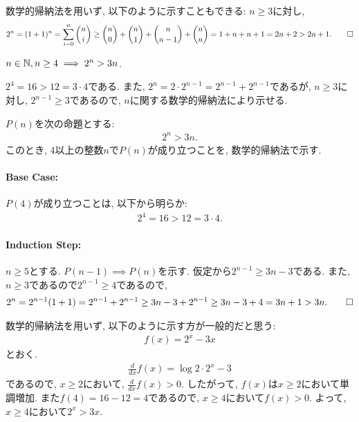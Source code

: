 \begin{rem}
  数学的帰納法を用いず, 以下のように示すこともできる:
  $n\geq 3$に対し, 
  \begin{align*}
    2^n=(1+1)^n=\sum_{i=0}^n \binom{n}{i}\geq \binom{n}{0}+\binom{n}{1}+\binom{n}{n-1}+\binom{n}{n}=1+n+n+1=2n+2> 2n+1
    .\qedhere
  \end{align*}
\end{rem}

\begin{prop}
  \label{p:20230814}
  $n\in\mathbb{N}, n\geq 4\implies 2^n > 3n$.
\end{prop}
\begin{proof**}
  $2^4=16>12=3\cdot 4$である.
  また,
  $2^n=2\cdot 2^{n-1}=2^{n-1}+2^{n-1}$であるが,
  $n\geq 3$に対し,
  $2^{n-1} \geq 3$であるので,
  $n$に関する数学的帰納法により示せる.
\end{proof**}
\begin{proof*}
  $P(n)$を次の命題とする:
  \begin{align*}
    2^n > 3n
    .
  \end{align*}
  このとき,
  $4$以上の整数$n$で$P(n)$が成り立つことを,
  数学的帰納法で示す.

  \paragraph{Base Case:}
  $P(4)$が成り立つことは, 以下から明らか:
  \begin{align*}
    2^4=16>12=3\cdot 4.
  \end{align*}
  \paragraph{Induction Step:}
  $n\geq 5$とする.
  $P(n-1)\implies P(n)$を示す.
  仮定から$2^{n-1}\geq 3n-3$である.
  また, $n\geq 3$であるので$2^{n-1}\geq 4$であるので,
  \begin{align*}
    2^n=2^{n-1}(1+1)=2^{n-1}+2^{n-1}\geq 3n-3+2^{n-1}\geq 3n-3+4=3n+1>3n
    .\qedhere
  \end{align*}
\end{proof*}

\begin{rem}
  数学的帰納法を用いず, 以下のように示す方が一般的だと思う:
  \begin{align*}
    f(x)=2^x-3x
  \end{align*}
  とおく.
  \begin{align*}
    \frac{d}{dx}f(x)=\log 2 \cdot 2^x-3
  \end{align*}
  であるので, $x\geq 2$において, $\frac{d}{dx}f(x)> 0$.
  したがって, $f(x)$は$x\geq 2$において単調増加.
  また$f(4)=16-12=4$であるので,
  $x\geq 4$において$f(x) > 0$.
  よって, $x\geq 4$において$2^x>3x$.
\end{rem}

